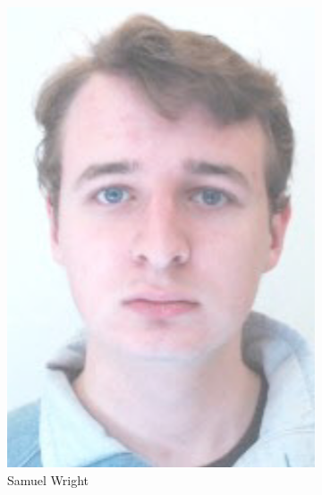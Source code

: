 \begin{figure}
\begin{subfigure}[b]{0.45\textwidth}
        \includegraphics[height=0.3\textheight]{Files/SW}
        \caption{Samuel Wright}
    \end{subfigure}
    ~~~~
    \begin{subfigure}[b]{0.45\textwidth}
        \centering

\end{subfigure}
\end{figure}
